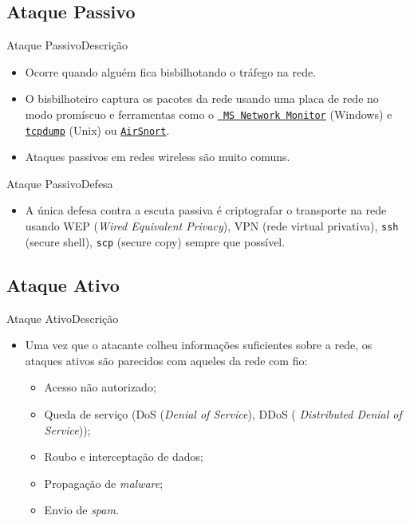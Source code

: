 \subsection{Ataque Passivo}

\begin{frame}{Ataque Passivo}{Descrição}

  \begin{itemize}[<+->]
  \item Ocorre quando alguém fica bisbilhotando o tráfego na rede.
  \item O bisbilhoteiro captura os pacotes da rede usando uma placa de
    rede no modo promíscuo e ferramentas como o
    \href{https://www.microsoft.com/en-us/download/details.aspx?id=4865}{\tt
      MS Network Monitor} (Windows) e
    \href{http://www.tcpdump.org}{\tt tcpdump} (Unix) ou
    \href{https://sourceforge.net/projects/airsnort/}{\tt AirSnort}.
  \item Ataques passivos em redes wireless são muito comuns.
  \end{itemize}
  
\end{frame}

\begin{frame}{Ataque Passivo}{Defesa}
  
  \begin{itemize}[<+->]
  \item A única defesa contra a escuta passiva é criptografar o
    transporte na rede usando WEP ({\em Wired Equivalent Privacy}), VPN
    (rede virtual privativa), {\tt ssh} (secure shell), {\tt scp}
    (secure copy) sempre que possível.
  \end{itemize}
\end{frame}

\subsection{Ataque Ativo}

\begin{frame}{Ataque Ativo}{Descrição}
  
  \begin{itemize}[<+->]
  \item Uma vez que o atacante colheu informações suficientes sobre a
    rede, os ataques ativos são parecidos com aqueles da rede com fio:
    \begin{itemize}
    \item Acesso não autorizado;
    \item Queda de serviço (DoS ({\em Denial of Service}), DDoS ({\em
        Distributed Denial of Service}));
    \item Roubo e interceptação de dados;
    \item Propagação de {\em malware};
    \item Envio de {\em spam}.
    \end{itemize}
  \end{itemize}
  
\end{frame}

